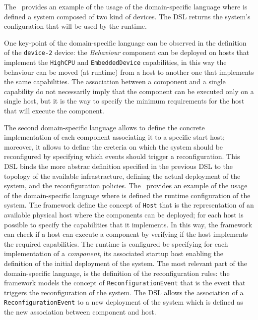 \documentclass[conference]{IEEEtran}
\begin{document}
The~ provides an example of the usage of the domain-specific language where is defined a system composed of two kind of devices.
%
The DSL returns the system's configuration that will be used by the runtime.

One key-point of the domain-specific language can be observed in the definition of the \texttt{device-2} device:
the \emph{Behaviour} component can be deployed on hosts that implement the \texttt{HighCPU} and \texttt{EmbeddedDevice} capabilities,
in this way the behaviour can be moved (at runtime) from a host to another one that implements the same capabilities.
%
The association between a component and a single capability do not necessarily imply that the component can be executed only on a single host,
but it is the way to specify the minimum requirements for the host that will execute the component.



The second domain-specific language allows to define the concrete implementation of each component associating it to a specific start host;
moreover, it allows to define the creteria on which the system should be reconfigured by specifying which events should trigger a reconfiguration.
%
This DSL binds the more abstrac definition specified in the previous DSL to the topology of the available infrastracture,
defining the actual deployment of the system, and the reconfiguration policies.
%
The~ provides an example of the usage of the domain-specific language where is defined the runtime configuration of the system.
%
The framework define the concept of \texttt{Host} that is the representation of an available physical host where the components can be deployed;
for each host is possible to specify the capabilities that it implements.
%
In this way, the framework can check if a host can execute a component by verifying if the host implements the required capabilities.
%
The runtime is configured be specifying for each implementation of a \emph{component},
its associated startup host enabling the definition of the initial deployment of the system.
%
The most relevant part of the domain-specific language, is the definition of the reconfiguration rules:
the framework models the concept of \texttt{ReconfigurationEvent}
that is the event that triggers the reconfiguration of the system.
%
The DSL allows the association of a \texttt{ReconfigurationEvent}
to a new deployment of the system which is defined as the new association between component and host.
\end{document}
